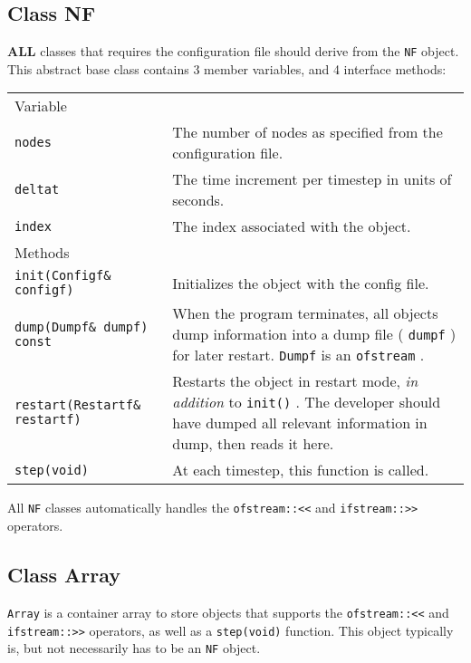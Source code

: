\documentclass[12pt,a4paper]{article}
\newcommand{\type}[1]{ {\small\small\tt #1} }
\begin{document}

\subsection{Class NF}
\label{sec:nf}

\textbf{ALL} classes that requires the configuration file should derive from the \type{NF} object. This abstract base class contains 3 member variables, and 4 interface methods:

\begin{tabular}{l p{10cm}}
Variable\\[6pt]
\type{nodes}&The number of nodes as specified from the configuration file.\\
\type{deltat}&The time increment per timestep in units of seconds.\\
\type{index}&The index associated with the object.\\[6pt]
Methods\\[6pt]
\type{init(Configf\& configf)}&Initializes the object with the config file.\\
 \type{dump(Dumpf\& dumpf) const}&When the program terminates, all objects dump information into a dump file (\type{dumpf}) for later restart. \type{Dumpf} is an \type{ofstream}.\\
\type{restart(Restartf\& restartf)}&Restarts the object in restart mode, \emph{in addition} to \type{init()}. The developer should have dumped all relevant information in dump, then reads it here.\\
\type{step(void)}&At each timestep, this function is called.\\
\end{tabular}

All \type{NF} classes automatically handles the \type{ofstream::<<} and \type{ifstream::>>} operators.

\subsection{Class Array}
\label{sec:array}

\type{Array} is a container array to store objects that supports the \type{ofstream::<<} and \type{ifstream::>>} operators, as well as a \type{step(void)} function. This object typically is, but not necessarily has to be an \type{NF} object.
\end{document}
